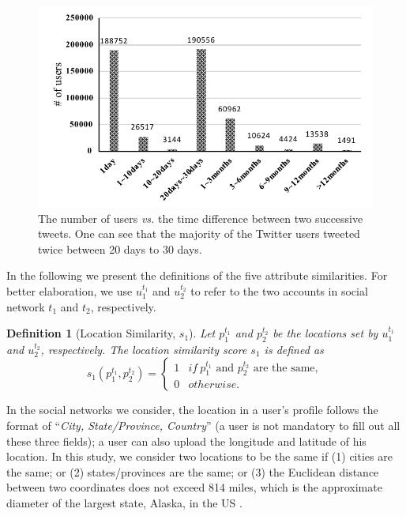 \documentclass[letterpaper,12pt]{article}
\newtheorem{definition}{Definition}
\begin{document}
\begin{figure}[!htb]
  \includegraphics[width=\textwidth]{distribution3.pdf}
  \caption{The number of users \emph{vs.} the time difference between two
    successive tweets. One can see that the majority of the Twitter
    users tweeted twice between 20 days to 30 days. %
    }
  \label{fig:timediff}
\end{figure}

In the following we present the definitions of the five attribute similarities. For better elaboration, we use $u_1^{t_1}$ and $u_2^{t_2}$ to refer to the two accounts in social network $t_1$ and $t_2$, respectively. 

\noindent \theoremstyle{definition}
\begin{definition}[Location Similarity, $s_1$]
Let $p_{1}^{t_1}$ and $p_{2}^{t_2}$ be the locations set by $u_{1}^{t_1}$ and $u_{2}^{t_2}$, respectively. The location similarity score $s_1$ is defined as
\begin{equation}
s_1(p_{1}^{t_1},p_{2}^{t_2})=
\begin{cases}
1 & if\ p_{1}^{t_1} \mbox{ and } p_{2}^{t_2} \mbox{ are the same},\\
0 & otherwise.
\end{cases}
\end{equation}
\label{def:loc}
\end{definition}
In the social networks we consider, the location in a user's profile follows the format of ``\textit{City, State/Province, Country}'' (a user is not mandatory to fill out all these three fields); a user can also upload the longitude and latitude of his location. In this study, we consider two locations to be the same if (1) cities are the same; or (2) states/provinces are the same; or (3) the Euclidean distance between two coordinates does not exceed 814 miles, which is the approximate diameter of the largest state, Alaska, in the US \cite{alaska}.
\end{document}
